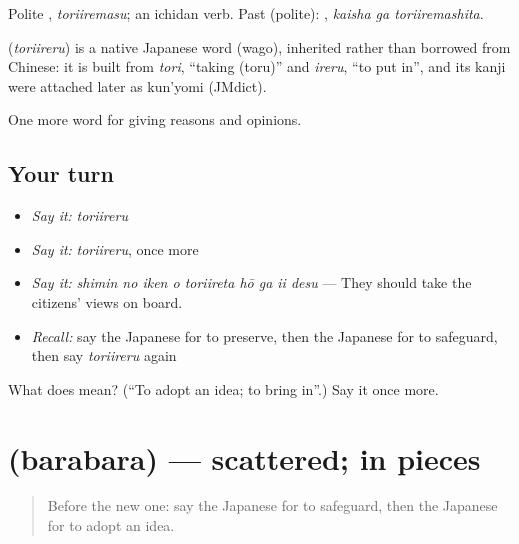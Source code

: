 Polite \textbf{}, \emph{toriiremasu}; an ichidan verb. Past (polite): \textbf{ }, \emph{kaisha ga toriiremashita}.

\begin{cousinweb}
\textbf{} (\emph{toriireru}) is a native Japanese word (wago), inherited rather than borrowed from Chinese: it is built from \emph{tori}, \textquotedblleft{}taking (toru)\textquotedblright{} and \emph{ireru}, \textquotedblleft{}to put in\textquotedblright{}, and its kanji were attached later as kun'yomi (JMdict).
\end{cousinweb}

\begin{grammarlens}[title={What you've built}]
One more word for giving reasons and opinions.
\end{grammarlens}

\subsection*{Your turn}
\begin{itemize}
\raggedright
  \item \emph{Say it:} \emph{toriireru}
  \item \emph{Say it:} \emph{toriireru}, once more
  \item \emph{Say it:} \emph{shimin no iken o toriireta hō ga ii desu} — They should take the citizens' views on board.
  \item \emph{Recall:} say the Japanese for to preserve, then the Japanese for to safeguard, then say \emph{toriireru} again
\end{itemize}

\begin{tcolorbox}[breakable,colback=teal!4,colframe=teal!35!black,title={Before you move on}]
What does  mean? (\textquotedblleft{}To adopt an idea; to bring in\textquotedblright{}.) Say it once more.
\end{tcolorbox}
\section[\texorpdfstring{\ja{ばらばら} (barabara)}{ばらばら (barabara)}]{ (barabara) — scattered; in pieces}

\label{lesson:JA-C339-barabara}



\begin{quote}
Before the new one: say the Japanese for to safeguard, then the Japanese for to adopt an idea.
\end{quote}

